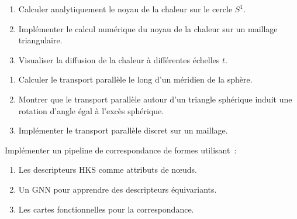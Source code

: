 \begin{exercice}
\begin{enumerate}
    \item Calculer analytiquement le noyau de la chaleur sur le cercle $S^1$.
    \item Impl\'ementer le calcul num\'erique du noyau de la chaleur sur un
          maillage triangulaire.
    \item Visualiser la diffusion de la chaleur \`a diff\'erentes \'echelles $t$.
\end{enumerate}
\end{exercice}

\begin{exercice}
\begin{enumerate}
    \item Calculer le transport parall\`ele le long d'un m\'eridien de la sph\`ere.
    \item Montrer que le transport parall\`ele autour d'un triangle sph\'erique
          induit une rotation d'angle \'egal \`a l'exc\`es sph\'erique.
    \item Impl\'ementer le transport parall\`ele discret sur un maillage.
\end{enumerate}
\end{exercice}

\begin{exercice}
Impl\'ementer un pipeline de correspondance de formes utilisant~:
\begin{enumerate}
    \item Les descripteurs HKS comme attributs de n\oe uds.
    \item Un GNN pour apprendre des descripteurs \'equivariants.
    \item Les cartes fonctionnelles pour la correspondance.
\end{enumerate}
\end{exercice}
